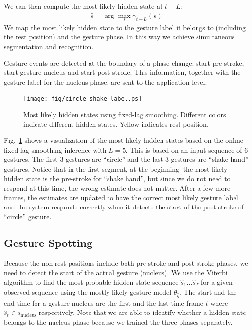 We can then compute the most likely hidden state at $t - L$:
\begin{align}
\hat{s} = \arg\max_s \gamma_{t - L}(s)
\end{align}
We map the most likely hidden state to the gesture label it
belongs to (including the rest position) and the gesture phase. In this way
we achieve simultaneous segmentation and recognition.

Gesture events are detected at the boundary of a phase change: start pre-stroke,
start gesture nucleus and start post-stroke. This information, together with the
gesture label for the nucleus phase, are sent to the application level.

\begin{figure}[t]
\centering
\texttt{[image: fig/circle\_shake\_label.ps]}
\caption{Most likely hidden states using fixed-lag smoothing. Different colors indicate different hidden states. Yellow indicates rest position.}
\label{fig:visual_hidden}
\end{figure}

Fig.~\ref{fig:visual_hidden} shows a visualization of the
most likely hidden states based on the online fixed-lag smoothing inference
with $L = 5$.
This is based on an input sequence of 6 gestures. The first 3 gestures are
``circle'' and the last 3 gestures are ``shake hand'' gestures. Notice that in
the first segment, at the beginning, the most likely hidden state is the
pre-stroke for ``shake hand'', but since we do not need to respond at this time,
the wrong estimate does not matter. After a few more frames, the estimates are
updated to have the correct most likely gesture label and the system
responds correctly when it detects the start of the post-stroke of ``circle''
gesture.

\subsection{Gesture Spotting}
Because the non-rest positions include both pre-stroke and post-stroke phases, we need
to detect the start of the actual gesture (nucleus). We use the Viterbi algorithm
to find the most probable hidden state sequence $\hat{s}_1\ldots\hat{s}_T$ for a given observed sequence using 
the mostly likely gesture model $\underline{\theta}_{\hat{g}}$. The start and the end time for a gesture nucleus are
the first and the last time frame $t$ where $\hat{s}_t\in s_{\text{nucleus}}$ respectively. Note that
we are able to identify whether a hidden state belongs to the nucleus phase because we trained the three phases
separately.

